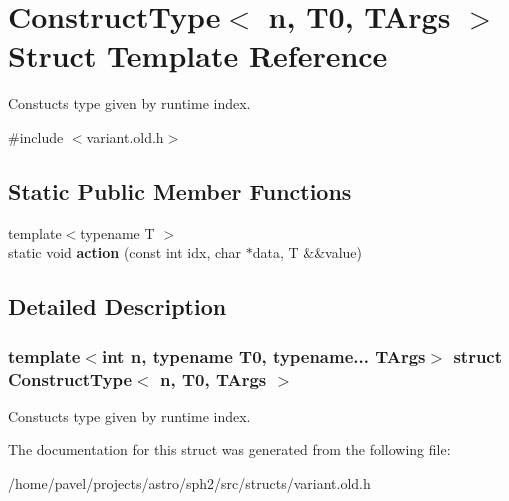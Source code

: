\hypertarget{structConstructType}{}\section{Construct\+Type$<$ n, T0, T\+Args $>$ Struct Template Reference}
\label{structConstructType}


Constucts type given by runtime index.  




{\ttfamily \#include $<$variant.\+old.\+h$>$}

\subsection*{Static Public Member Functions}
\begin{DoxyCompactItemize}
\item 
\hypertarget{structConstructType_acdc048e3ce2a7411b7b16d2fb5d3139e}{}\label{structConstructType_acdc048e3ce2a7411b7b16d2fb5d3139e} 
{\footnotesize template$<$typename T $>$ }\\static void {\bfseries action} (const int idx, char $\ast$data, T \&\&value)
\end{DoxyCompactItemize}


\subsection{Detailed Description}
\subsubsection*{template$<$int n, typename T0, typename... T\+Args$>$\newline
struct Construct\+Type$<$ n, T0, T\+Args $>$}

Constucts type given by runtime index. 

The documentation for this struct was generated from the following file\+:\begin{DoxyCompactItemize}
\item 
/home/pavel/projects/astro/sph2/src/structs/variant.\+old.\+h\end{DoxyCompactItemize}
